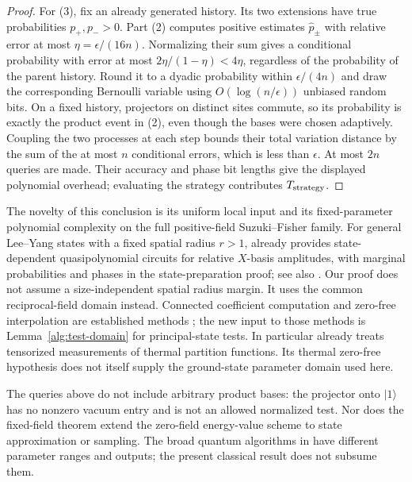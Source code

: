 \documentclass[reqno]{amsart}
\theoremstyle{definition}
\theoremstyle{remark}
\begin{document}
\begin{proof}
For (3), fix an already generated history.  Its two extensions
have true probabilities \(p_+,p_->0\).  Part (2) computes
positive estimates \(\widehat p_\pm\) with relative error at
most \(\eta=\epsilon/(16n)\).
Normalizing their sum gives a conditional probability with
error at most \(2\eta/(1-\eta)<4\eta\), regardless of the
probability of the parent history.  Round it to a dyadic
probability within \(\epsilon/(4n)\) and draw the corresponding
Bernoulli variable using
\(O(\log(n/\epsilon))\) unbiased random bits.
On a fixed history, projectors on distinct sites commute, so
its probability is exactly the product event in (2), even
though the bases were chosen adaptively.
Coupling the two processes at each step bounds their total
variation distance by the sum of the at most \(n\) conditional
errors, which is less than \(\epsilon\).
At most \(2n\) queries are made.  Their accuracy and phase bit
lengths give the displayed polynomial overhead; evaluating the
strategy contributes \(T_{\rm strategy}\).
\end{proof}

The novelty of this conclusion is its uniform local input and its
fixed-parameter polynomial complexity on the full positive-field
Suzuki--Fisher family.  For general Lee--Yang states with a fixed
spatial radius \(r>1\), \cite[Section~4, Theorems~5--6]{WBG26}
already provides state-dependent quasipolynomial circuits for
relative \(X\)-basis amplitudes, with marginal probabilities and phases in
the state-preparation proof; see also \cite{WongThesis26}.
Our proof does not assume a size-independent spatial radius
margin.  It uses the common reciprocal-field domain instead.
Connected coefficient computation and zero-free interpolation
are established methods
\cite{PatelRegts17,YYZ22,WildAlhambra23}; the new input to those
methods is Lemma~\ref{alg:test-domain} for principal-state tests.
In particular \cite[Theorem~15]{YYZ22} already treats tensorized
measurements of thermal partition functions.  Its thermal
zero-free hypothesis does not itself supply the ground-state
parameter domain used here.

The queries above do not include arbitrary product bases:
the projector onto \(|1\rangle\) has no nonzero vacuum entry
and is not an allowed normalized test.
Nor does the fixed-field theorem extend the zero-field
energy-value scheme to state approximation or sampling.
The broad quantum algorithms in \cite{BGLW26,RT26} have
different parameter ranges and outputs; the present classical
result does not subsume them.
\end{document}
